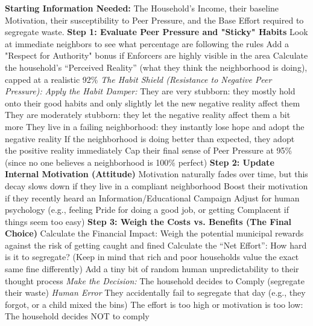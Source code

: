 \newpage
\vspace*{-2cm} 
\begin{algorithm}[H]
\caption{The Household's Daily Decision Process: To Segregate or Not?}
\label{alg:household_decision_english}
\begin{algorithmic}[1]
\State \textbf{Starting Information Needed:} The Household's Income, their baseline Motivation, their susceptibility to Peer Pressure, and the Base Effort required to segregate waste.
\Statex
\State \textbf{Step 1: Evaluate Peer Pressure and "Sticky" Habits}
\State Look at immediate neighbors to see what percentage are following the rules
\State Add a "Respect for Authority" bonus if Enforcers are highly visible in the area
\State Calculate the household's ``Perceived Reality'' (what they think the neighborhood is doing), capped at a realistic 92\%
\Statex
\State \textit{The Habit Shield (Resistance to Negative Peer Pressure):}
    \State \textit{Apply the Habit Damper:}
        \State They are very stubborn: they mostly hold onto their good habits and only slightly let the new negative reality affect them
        \State They are moderately stubborn: they let the negative reality affect them a bit more
    \Else
        \State They live in a failing neighborhood: they instantly lose hope and adopt the negative reality
    \EndIf
\Else
    \State If the neighborhood is doing better than expected, they adopt the positive reality immediately
\EndIf
\State Cap their final sense of Peer Pressure at 95\% (since no one believes a neighborhood is 100\% perfect)
\Statex
\State \textbf{Step 2: Update Internal Motivation (Attitude)}
\State Motivation naturally fades over time, but this decay slows down if they live in a compliant neighborhood
\State Boost their motivation if they recently heard an Information/Educational Campaign
\State Adjust for human psychology (e.g., feeling Pride for doing a good job, or getting Complacent if things seem too easy)
\Statex
\State \textbf{Step 3: Weigh the Costs vs. Benefits (The Final Choice)}
\State Calculate the Financial Impact: Weigh the potential municipal rewards against the risk of getting caught and fined
\State Calculate the ``Net Effort'': How hard is it to segregate? (Keep in mind that rich and poor households value the exact same fine differently)
\State Add a tiny bit of random human unpredictability to their thought process
\Statex
\State \textit{Make the Decision:}
    \State The household decides to Comply (segregate their waste)
    \Statex
    \State \textit{Human Error}
        \State They accidentally fail to segregate that day (e.g., they forgot, or a child mixed the bins)
    \EndIf
\Else
    \State The effort is too high or motivation is too low: The household decides NOT to comply
\EndIf
\end{algorithmic}
\end{algorithm}

